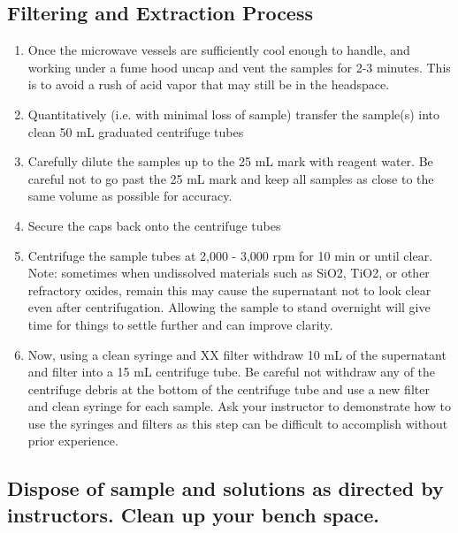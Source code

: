 \documentclass[12pt]{../SOP3_beta}\usepackage[]{graphicx}\usepackage[]{color}
\begin{document}
\subsection{Filtering and Extraction Process}
  \begin{enumerate}
  \item Once the microwave vessels are sufficiently cool enough to handle, and working under a fume hood uncap and vent the samples for 2-3 minutes. This is to avoid a rush of acid vapor that may still be in the headspace. 
  \item Quantitatively (i.e. with minimal loss of sample) transfer the sample(s) into clean 50 mL graduated centrifuge tubes 
  \item Carefully dilute the samples up to the 25 mL mark with reagent water. Be careful not to go past the 25 mL mark and keep all samples as close to the same volume as possible for accuracy. %
  \item Secure the caps back onto the centrifuge tubes
  \item Centrifuge the sample tubes at 2,000 - 3,000 rpm for 10 min or until clear. \vspace{4mm} \\
  Note: sometimes when undissolved materials such as SiO2, TiO2, or other refractory oxides, remain this may cause the supernatant not to look clear even after centrifugation. Allowing the sample to stand overnight will give time for things to settle further and can improve clarity. 
  \item Now, using a clean syringe and XX filter withdraw 10 mL of the supernatant and filter into a 15 mL centrifuge tube. Be careful not withdraw any of the centrifuge debris at the bottom of the centrifuge tube and use a new filter and clean syringe for each sample.  Ask your instructor to demonstrate how to use the syringes and filters as this step can be difficult to accomplish without prior experience.%
  \end{enumerate}
\subsection { Dispose of sample and solutions as directed by instructors. Clean up your bench space.}
\end{document}
